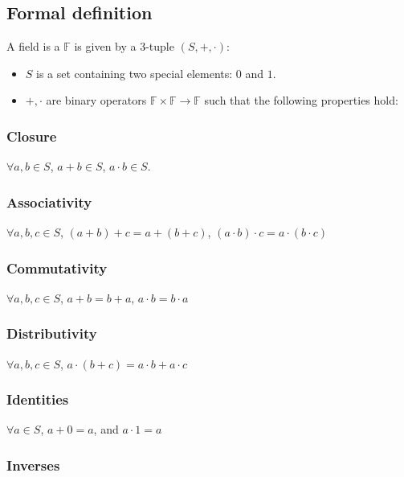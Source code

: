\documentclass{idc_msc}
\begin{document}
\subsection{Formal definition}

A field is a \(\mathbb{F}\) is given by a 3-tuple \((S,+,\cdot)\):

\begin{itemize}
  \item \(S\) is a set containing two special elements: \(0\) and \(1\).
  \item \(+, \cdot\) are binary operators \(\mathbb{F} \times \mathbb{F} \to \mathbb{F}\) such that the following properties hold:
\end{itemize}

\subsubsection{Closure}

\(\forall a,b \in S\), \(a+b \in S\), \(a \cdot b \in S\).

\subsubsection{Associativity}

\(\forall a,b,c \in S\), \((a+b)+c=a+(b+c)\), \((a \cdot b) \cdot c = a \cdot (b \cdot c)\)

\subsubsection{Commutativity}

\(\forall a,b,c \in S\), \(a + b = b + a\), \(a \cdot b = b \cdot a\)

\subsubsection{Distributivity}

\(\forall a,b,c \in S\), \(a \cdot (b + c) = a \cdot b + a \cdot c\)

\subsubsection{Identities}

\(\forall a \in S\), \(a + 0 = a\), and \(a \cdot 1 = a\)

\subsubsection{Inverses}
\end{document}
